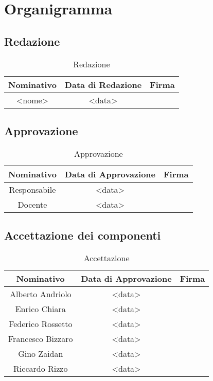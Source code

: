 \section{Organigramma}

\subsection{Redazione}
\begin{table}[h]
\centering
\bgroup
\def\arraystretch{3}
\begin{tabular}{| c | c | p{5cm} |}
\hline
\textbf{Nominativo} & \textbf{Data di Redazione} & \textbf{Firma}\\ \hline \hline
<nome> & <data> &  \\ \hline  
\end{tabular}
\egroup
\caption{Redazione}
\end{table}

\subsection{Approvazione}
\begin{table}[h]
\centering
\bgroup
\def\arraystretch{3}
\begin{tabular}{| c | c | p{5cm} |}
\hline
\textbf{Nominativo} & \textbf{Data di Approvazione} & \textbf{Firma}\\ \hline \hline
Responsabile & <data> & \\ \hline  
Docente & <data> & \\ \hline
\end{tabular}
\egroup
\caption{Approvazione}
\end{table}

\newpage

\subsection{Accettazione dei componenti}
\begin{table}[h]
\centering
\bgroup
\def\arraystretch{3}
\begin{tabular}{| c | c | p{5cm} |}
\hline
\textbf{Nominativo} & \textbf{Data di Approvazione} & \textbf{Firma}\\ \hline \hline
Alberto Andriolo & <data> & \\ \hline  
Enrico Chiara & <data> & \\ \hline
Federico Rossetto & <data> & \\ \hline
Francesco Bizzaro & <data> & \\ \hline
Gino Zaidan & <data> & \\ \hline
Riccardo Rizzo & <data> & \\ \hline
\end{tabular}
\egroup
\caption{Accettazione}
\end{table}

